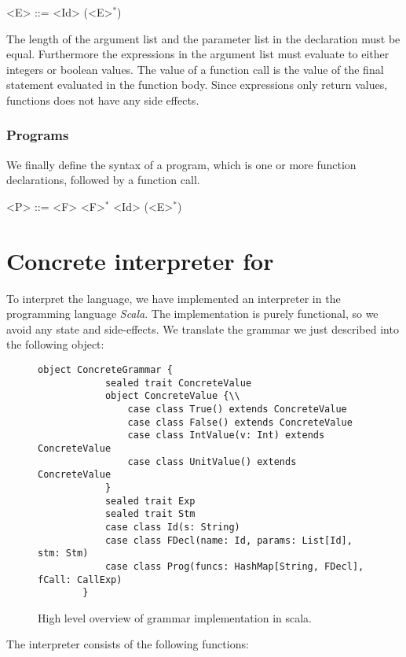 \begin{grammar}
	<E> ::= <Id> (<E>$^{*}$) 
\end{grammar}

The length of the argument list and the parameter list in the declaration must be equal. Furthermore the expressions in the argument list must evaluate to either integers or  boolean values.
The value of a function call is the value of the final statement evaluated in the function body. Since expressions only return values, functions does not have any side effects.


\subsubsection{Programs}
We finally define the syntax of a \explanguage program, which is one or more function declarations, followed by a function call. 

\begin{grammar}
	<P> ::= <F> <F>$^{*}$  <Id> (<E>$^{*}$) 
\end{grammar}

\section{Concrete interpreter for \explanguage}
To interpret the language, we have implemented an interpreter in the programming language \textsl{Scala}. The implementation is purely functional, so we avoid any state and side-effects. We translate the grammar we just described into the following object:

\begin{figure}[!h]
	\begin{lstlisting}[style=simple]
		object ConcreteGrammar {
			sealed trait ConcreteValue
			object ConcreteValue {\\
				case class True() extends ConcreteValue
				case class False() extends ConcreteValue
				case class IntValue(v: Int) extends ConcreteValue
				case class UnitValue() extends ConcreteValue
			}
			sealed trait Exp
			sealed trait Stm
			case class Id(s: String)
			case class FDecl(name: Id, params: List[Id], stm: Stm)
			case class Prog(funcs: HashMap[String, FDecl], fCall: CallExp)	
		}
	\end{lstlisting}
	\caption{High level overview of grammar implementation in scala.}
\end{figure}

The interpreter consists of the following functions:

